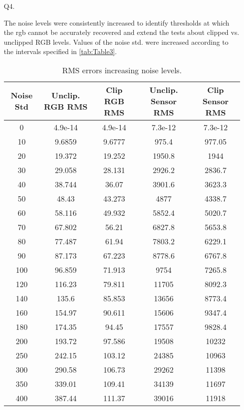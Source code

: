 \documentclass[12pt]{report}
\begin{document}
\begin{enumerate}
    \item[Q4.]

    The noise levels were consistently increased to identify thresholds at which the rgb cannot be accurately recovered and 
    extend the tests about clipped vs. unclipped RGB levels. Values of the noise std. were increased according to the intervals 
    specified in \autoref{tab:Table3}.

    \begin{table}[h!]
    \begin{center}
    \begin{tabular}{| c | c | c | c | c |} 
        \hline
        Noise Std & Unclip. RGB RMS & Clip RGB RMS & Unclip. Sensor RMS & Clip Sensor RMS\\ 
        \hline \hline
        0  &  4.9e-14 & 4.9e-14 & 7.3e-12 & 7.3e-12  \\ 
        10 &  9.6859 &   9.6777 &  975.4 &  977.05  \\ 
        20 &  19.372 &   19.252 & 1950.8 & 1944  \\ 
        30 &  29.058 &   28.131 & 2926.2 & 2836.7  \\ 
        40 &  38.744 &    36.07 & 3901.6 & 3623.3  \\ 
        50 &   48.43 &   43.273 &   4877 & 4338.7  \\ 
        60 &  58.116 &   49.932 & 5852.4 & 5020.7  \\ 
        70 &  67.802 &    56.21 & 6827.8 & 5653.8  \\ 
        80 &  77.487 &    61.94 & 7803.2 & 6229.1  \\ 
        90 &  87.173 &   67.223 & 8778.6 & 6767.8  \\ 
        100 & 96.859 &   71.913 &   9754 & 7265.8  \\ 
        120 & 116.23 &   79.811 &  11705 & 8092.3  \\ 
        140 &  135.6 &   85.853 &  13656 & 8773.4  \\ 
        160 & 154.97 &   90.611 &  15606 & 9347.4  \\ 
        180 & 174.35 &    94.45 &  17557 & 9828.4  \\ 
        200 & 193.72 &   97.586 &  19508 & 10232  \\ 
        250 & 242.15 &   103.12 &  24385 & 10963  \\ 
        300 & 290.58 &   106.73 &  29262 & 11398  \\ 
        350 & 339.01 &   109.41 &  34139 & 11697  \\ 
        400 & 387.44 &   111.37 &  39016 & 11918  \\ 
        \hline
    \end{tabular}
    \caption{RMS errors increasing noise levels.}
    \label{tab:Table3}
    \end{center}
    \end{table}


\end{enumerate}
\end{document}
